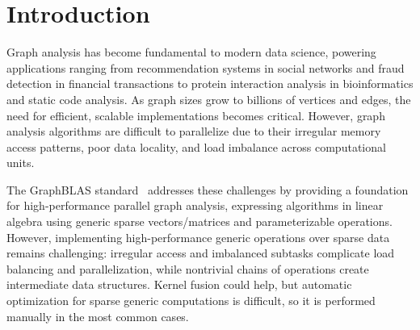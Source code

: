 \section{Introduction}

Graph analysis has become fundamental to modern data science, powering applications ranging from recommendation systems in social networks and fraud detection in financial transactions to protein interaction analysis in bioinformatics and static code analysis.
As graph sizes grow to billions of vertices and edges, the need for efficient, scalable implementations becomes critical.
However, graph analysis algorithms are difficult to parallelize due to their irregular memory access patterns, poor data locality, and load imbalance across computational units.

%

The GraphBLAS standard~\cite{9460572} addresses these challenges by providing a foundation for high-performance parallel graph analysis, expressing algorithms in linear algebra using generic sparse vectors/matrices and parameterizable operations. However, implementing high-performance generic operations over sparse data remains challenging: irregular access and imbalanced subtasks complicate load balancing and parallelization, while nontrivial chains of operations create intermediate data structures. Kernel fusion could help, but automatic optimization for sparse generic computations is difficult, so it is performed manually in the most common cases.

